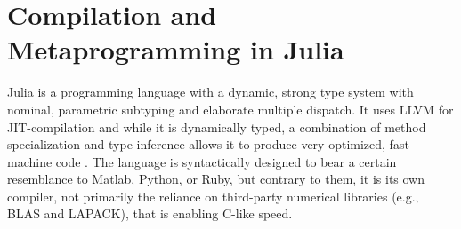\section{Compilation and Metaprogramming in Julia}
\label{sec:comp-metapr-julia}

Julia \parencite{bezanson2017julia} is a programming language with a dynamic, strong type system
with nominal, parametric subtyping and elaborate multiple dispatch.  It uses LLVM
\parencite{llvmproject2019llvm} for JIT-compilation and while it is dynamically typed, a combination
of method specialization and type inference allows it to produce very optimized, fast machine code
\parencite{bezanson2018julia}.  The language is syntactically designed to bear a certain resemblance
to Matlab, Python, or Ruby, but contrary to them, it is its own compiler, not primarily the reliance
on third-party numerical libraries (e.g., BLAS and LAPACK), that is enabling C-like speed.


